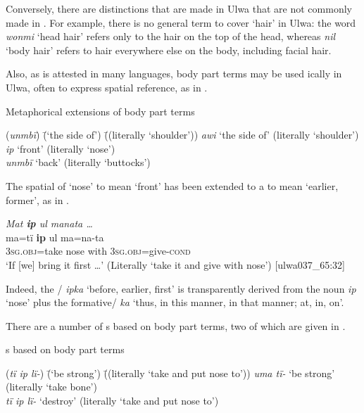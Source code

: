   Conversely, there are distinctions that are made in Ulwa that are not commonly made in . For example, there is no general term to cover ‘hair’ in Ulwa: the word \textit{wonmi} ‘head hair’ refers only to the hair on the top of the head, whereas \textit{nil} ‘body hair’ refers to hair everywhere else on the body, including facial hair.

  Also, as is attested in many languages, body part terms may be used ically in Ulwa, often to express spatial reference, as in .

\ea%
    \label{ex:sem:15}
          Metaphorical extensions of body part terms
\begin{tabbing}
{(\textit{unmbï})} \= {(‘the side of’)} \= {((literally ‘shoulder’))}\kill
{\textit{awi}} \> {‘the side of’} \> {(literally ‘shoulder’)}\\
{\textit{ip}} \> {‘front’} \> {(literally ‘nose’)}\\
{\textit{unmbï}} \> {‘back’} \> {(literally ‘buttocks’)}
\end{tabbing}
\z

The spatial  of ‘nose’ to mean ‘front’ has been extended to a   to mean ‘earlier, former’, as in .

\ea%
    \label{ex:sem:16}
          \textit{Mat \textbf{ip} ul manata …}\\
\gll    ma=tï      \textbf{ip}    ul  ma=na-ta\\
    3\textsc{sg.obj}=take  nose  with  3\textsc{sg.obj}=give-\textsc{cond}\\
\glt `If [we] bring it first …’ (Literally ‘take it and give with nose’) [ulwa037\_65:32]
\z

Indeed, the / \textit{ipka} ‘before, earlier, first’ is transparently derived from the noun \textit{ip} ‘nose’ plus the formative/ \textit{ka} ‘thus, in this manner, in that manner; at, in, on’.

  There are a number of s based on body part terms, two of which are given in .

\ea%
    \label{ex:sem:17}
          s based on body part terms
\begin{tabbing}
{(\textit{tï ip lï-})} \= {(‘be strong’)} \= {((literally ‘take and put nose to’))}\kill
{\textit{uma tï-}} \> {‘be strong’} \> {(literally ‘take bone’)}\\
{\textit{tï ip lï-}} \> {‘destroy’} \> {(literally ‘take and put nose to’)}
\end{tabbing}
\z

